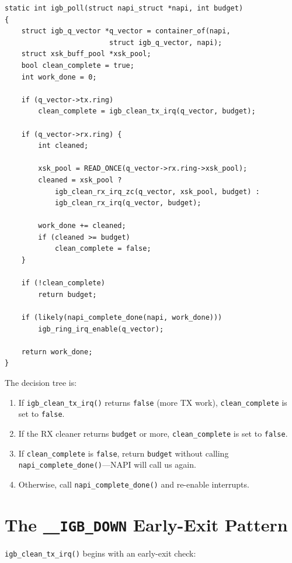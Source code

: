\documentclass[11pt,a4paper,openany]{book}
\newcommand{\func}[1]{\texttt{#1()}}
\begin{document}
\begin{lstlisting}[caption={\texttt{igb\_poll()} (igb\_main.c:8280)},
    label=lst:igb-poll]
static int igb_poll(struct napi_struct *napi, int budget)
{
    struct igb_q_vector *q_vector = container_of(napi,
                         struct igb_q_vector, napi);
    struct xsk_buff_pool *xsk_pool;
    bool clean_complete = true;
    int work_done = 0;

    if (q_vector->tx.ring)
        clean_complete = igb_clean_tx_irq(q_vector, budget);

    if (q_vector->rx.ring) {
        int cleaned;

        xsk_pool = READ_ONCE(q_vector->rx.ring->xsk_pool);
        cleaned = xsk_pool ?
            igb_clean_rx_irq_zc(q_vector, xsk_pool, budget) :
            igb_clean_rx_irq(q_vector, budget);

        work_done += cleaned;
        if (cleaned >= budget)
            clean_complete = false;
    }

    if (!clean_complete)
        return budget;

    if (likely(napi_complete_done(napi, work_done)))
        igb_ring_irq_enable(q_vector);

    return work_done;
}
\end{lstlisting}

The decision tree is:

\begin{enumerate}
\item If \func{igb\_clean\_tx\_irq} returns \texttt{false} (more TX work),
    \texttt{clean\_complete} is set to \texttt{false}.
\item If the RX cleaner returns \texttt{budget} or more,
    \texttt{clean\_complete} is set to \texttt{false}.
\item If \texttt{clean\_complete} is \texttt{false}, return
    \texttt{budget} without calling \func{napi\_complete\_done}---NAPI
    will call us again.
\item Otherwise, call \func{napi\_complete\_done} and re-enable
    interrupts.
\end{enumerate}

\section{The \texttt{\_\_IGB\_DOWN} Early-Exit Pattern}
\label{sec:igb-down-pattern}

\func{igb\_clean\_tx\_irq} begins with an early-exit check:
\end{document}
